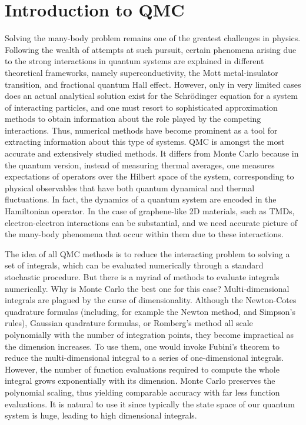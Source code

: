 \section{Introduction to \acl{QMC}}
\label{sec:introQMC}

Solving the many-body problem remains one of the greatest challenges in physics.
Following the wealth of attempts at such pursuit, certain phenomena arising due to the strong interactions in quantum systems are explained in different theoretical frameworks, namely superconductivity, the Mott metal-insulator transition, and fractional quantum Hall effect.
However, only in very limited cases does an actual analytical solution exist for the  Schr\"odinger equation for a system of interacting particles, and one must resort to sophisticated approximation methods to obtain information about the role played by the competing interactions.
Thus, numerical methods have become prominent as a tool for extracting information about this type of systems.
\acl{QMC} is amongst the most accurate and extensively studied methods.
It differs from  Monte Carlo because in the quantum version, instead of measuring thermal averages, one measures expectations of operators over the Hilbert space of the system, corresponding to physical observables that have both quantum dynamical and thermal fluctuations.
In fact, the dynamics of a quantum system are encoded in the Hamiltonian operator.
In the case of graphene-like \ac{2D} materials, such as \acp{TMD}, electron-electron interactions can be substantial, and we need accurate picture of the many-body phenomena that occur within them due to these interactions.

The idea of all \ac{QMC} methods is to reduce the interacting problem to solving a set of integrals, which can be evaluated numerically through a standard stochastic procedure.
But there is a myriad of methods to evaluate integrals numerically.
Why is Monte Carlo the best one for this case?
Multi-dimensional integrals are plagued by the curse of dimensionality.
Although the Newton-Cotes quadrature formulas (including, for example the Newton method, and Simpson's rules), Gaussian quadrature formulas, or Romberg's method all scale polynomially with the number of integration points, they become impractical as the dimension increases.
To use them, one would invoke Fubini's theorem to reduce the multi-dimensional integral to a series of one-dimensional integrals.
However, the number of function evaluations required to compute the whole integral grows exponentially with its dimension.
Monte Carlo preserves the polynomial scaling, thus yielding comparable accuracy with far less function evaluations.
It is natural to use it since typically the state space of our quantum system is huge, leading to high dimensional integrals.

